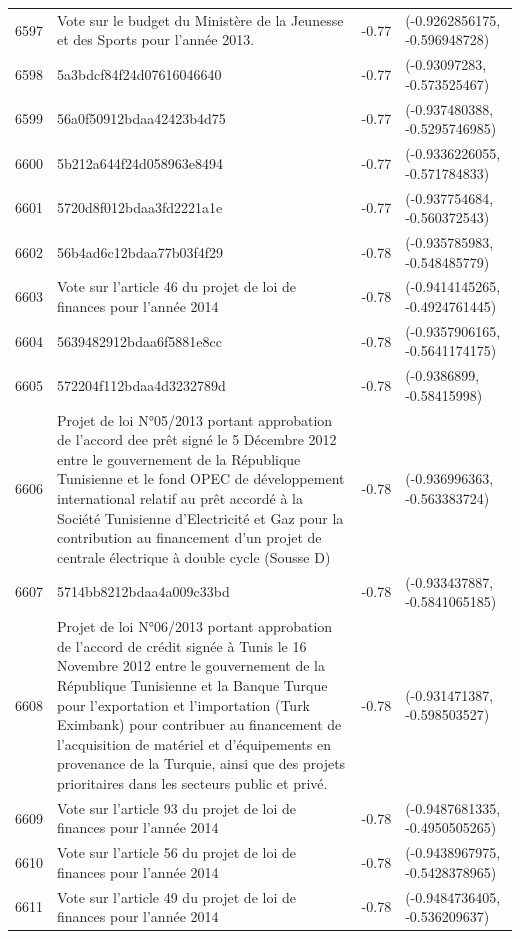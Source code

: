 \begin{table}[ht]
\begin{tabular}{rlrl}
  6597 & Vote sur le budget du Ministère de la Jeunesse et des Sports pour l'année 2013. & -0.77 & (-0.9262856175, -0.596948728) \\ 
  6598 & 5a3bdcf84f24d07616046640 & -0.77 & (-0.93097283, -0.573525467) \\ 
  6599 & 56a0f50912bdaa42423b4d75 & -0.77 & (-0.937480388, -0.5295746985) \\ 
  6600 & 5b212a644f24d058963e8494 & -0.77 & (-0.9336226055, -0.571784833) \\ 
  6601 & 5720d8f012bdaa3fd2221a1e & -0.77 & (-0.937754684, -0.560372543) \\ 
  6602 & 56b4ad6c12bdaa77b03f4f29 & -0.78 & (-0.935785983, -0.548485779) \\ 
  6603 & Vote sur l'article 46 du projet de loi de finances pour l'année 2014 & -0.78 & (-0.9414145265, -0.4924761445) \\ 
  6604 & 5639482912bdaa6f5881e8cc & -0.78 & (-0.9357906165, -0.5641174175) \\ 
  6605 & 572204f112bdaa4d3232789d & -0.78 & (-0.9386899, -0.58415998) \\ 
  6606 & Projet de loi N°05/2013 portant approbation de l'accord dee prêt signé le 5 Décembre 2012 entre le gouvernement de la République Tunisienne et le fond OPEC de développement international relatif au prêt accordé à la Société Tunisienne d'Electricité et Gaz pour la contribution au financement d'un projet de centrale électrique à double cycle (Sousse D) & -0.78 & (-0.936996363, -0.563383724) \\ 
  6607 & 5714bb8212bdaa4a009c33bd & -0.78 & (-0.933437887, -0.5841065185) \\ 
  6608 & Projet de loi N°06/2013 portant approbation de l'accord de crédit signée à Tunis le 16 Novembre 2012 entre le gouvernement de la République Tunisienne et la Banque Turque pour l’exportation et l’importation (Turk Eximbank)  pour contribuer au financement de l’acquisition de matériel et d’équipements en provenance de la Turquie, ainsi que des projets prioritaires dans les secteurs public et privé. & -0.78 & (-0.931471387, -0.598503527) \\ 
  6609 & Vote sur l'article 93 du projet de loi de finances pour l'année 2014 & -0.78 & (-0.9487681335, -0.4950505265) \\ 
  6610 & Vote sur l'article 56 du projet de loi de finances pour l'année 2014 & -0.78 & (-0.9438967975, -0.5428378965) \\ 
  6611 & Vote sur l'article 49 du projet de loi de finances pour l'année 2014 & -0.78 & (-0.9484736405, -0.536209637) \\ 

\end{tabular}
\end{table}
